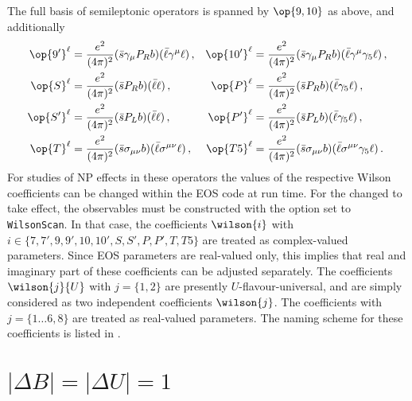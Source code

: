 The full basis of semileptonic operators is spanned by $\op{9,10}$ as above, and additionally
\begin{align}
  \op{9'}^{\ell}  & = \frac{e^2}{(4\pi)^2} (\bar{s} \gamma_\mu P_R b) 
                      (\bar{\ell} \gamma^\mu \ell) \,, &
  \op{10'}^{\ell} & = \frac{e^2}{(4\pi)^2} (\bar{s} \gamma_\mu P_R b)
                      (\bar{\ell} \gamma^\mu \gamma_5 \ell) \,,\\
  \op{S}^{\ell}   & = \frac{e^2}{(4\pi)^2} (\bar{s} P_R b)
                      (\bar{\ell} \ell) \,, &
  \op{P}^{\ell}   & = \frac{e^2}{(4\pi)^2} (\bar{s} P_R b)
                      (\bar{\ell} \gamma_5 \ell) \,,\\
  \op{S'}^{\ell}  & = \frac{e^2}{(4\pi)^2} (\bar{s} P_L b)
                      (\bar{\ell} \ell) \,, &
  \op{P'}^{\ell}  & = \frac{e^2}{(4\pi)^2} (\bar{s} P_L b)
                      (\bar{\ell} \gamma_5 \ell) \,,\\
  \op{T}^{\ell}   & = \frac{e^2}{(4\pi)^2} (\bar{s} \sigma_{\mu\nu} b)
                      (\bar{\ell} \sigma^{\mu\nu} \ell) \,, &
  \op{T5}^{\ell}  & = \frac{e^2}{(4\pi)^2} (\bar{s} \sigma_{\mu\nu} b)
                      (\bar{\ell} \sigma^{\mu\nu} \gamma_5 \ell) \,.
\end{align}
For studies of NP effects in these operators the values of the respective Wilson coefficients
can be changed within the EOS code at run time. For the changed to take effect, the observables
must be constructed with the option  set to \texttt{WilsonScan}. In that case, the
coefficients $\wilson{i}$ with $i\in \lbrace 7,7',9,9',10,10',S,S',P,P',T,T5\rbrace$ are treated
as complex-valued parameters.
Since EOS parameters are real-valued only, this implies that real and
imaginary part of these coefficients can be adjusted separately.
The coefficients $\wilson{j}{U}$ with $j=\lbrace 1,2\rbrace$ are presently
$U$-flavour-universal, and are simply considered as two independent coefficients $\wilson{j}$.
The coefficients with $j=\lbrace 1\dots 6, 8\rbrace$ are treated as real-valued parameters.
The naming scheme for these coefficients is listed in .


%
%

\section{$|\Delta B| = |\Delta U| = 1$}

